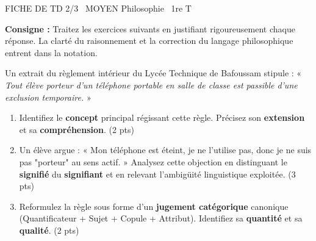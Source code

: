 \documentclass[11pt]{article}
\begin{document}
\begin{tcolorbox}[enhanced,colback=popink,colframe=popink,arc=10pt,boxrule=0pt,left=12pt,right=12pt,top=9pt,bottom=9pt]
{\color{white}\popxbold\small FICHE DE TD 2/3 \textbullet\ MOYEN \hfill Philosophie \textbullet\ 1re T\par}
\end{tcolorbox}
\vspace{4pt}
\noindent \textbf{Consigne :} Traitez les exercices suivants en justifiant rigoureusement chaque réponse. La clarté du raisonnement et la correction du langage philosophique entrent dans la notation.

\begin{exercice}
Un extrait du règlement intérieur du Lycée Technique de Bafoussam stipule : « \textit{Tout élève porteur d'un téléphone portable en salle de classe est passible d'une exclusion temporaire.} » 
\begin{enumerate}
    \item Identifiez le \textbf{concept} principal régissant cette règle. Précisez son \textbf{extension} et sa \textbf{compréhension}. (2 pts)
    \item Un élève argue : « Mon téléphone est éteint, je ne l'utilise pas, donc je ne suis pas "porteur" au sens actif. » Analysez cette objection en distinguant le \textbf{signifié} du \textbf{signifiant} et en relevant l'ambigüité linguistique exploitée. (3 pts)
    \item Reformulez la règle sous forme d'un \textbf{jugement catégorique} canonique (Quantificateur + Sujet + Copule + Attribut). Identifiez sa \textbf{quantité} et sa \textbf{qualité}. (2 pts)
\end{enumerate}
\end{exercice}
\end{document}
